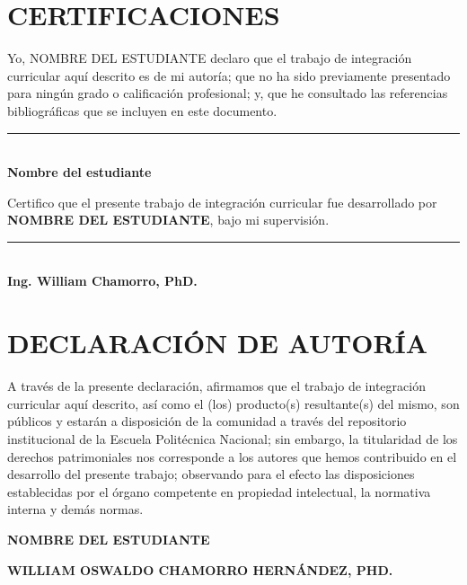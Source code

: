 \chapter*{CERTIFICACIONES}

\justifying
Yo, NOMBRE DEL ESTUDIANTE declaro que el trabajo de integración curricular aquí descrito es de mi autoría; que no ha sido previamente presentado para ningún grado o calificación profesional; y, que he consultado las referencias bibliográficas que se incluyen en este documento.

\vspace{2cm}

\begin{center}
    \rule{8cm}{0.5pt}\\ %
    \textbf{Nombre del estudiante} %
\end{center}

\vspace{2cm}
\justifying
Certifico que el presente trabajo de integración curricular fue desarrollado por \textbf{NOMBRE DEL ESTUDIANTE}, bajo mi supervisión.

\vspace{2cm}

\begin{center}
    \rule{8cm}{0.5pt}\\ %
    \textbf{Ing. William Chamorro, PhD.} %
\end{center}




\chapter*{DECLARACIÓN DE AUTORÍA}

\justifying
A través de la presente declaración, afirmamos que el trabajo de integración curricular aquí descrito, así como el (los) producto(s) resultante(s) del mismo, son públicos y estarán a disposición de la comunidad a través del repositorio institucional de la Escuela Politécnica Nacional; sin embargo, la titularidad de los derechos patrimoniales nos corresponde a los autores que hemos contribuido en el desarrollo del presente trabajo; observando para el efecto las disposiciones establecidas por el órgano competente en propiedad intelectual, la normativa interna y demás normas.

\vspace{2cm}

\raggedright
    \textbf{NOMBRE DEL ESTUDIANTE} %
    \vspace{0.1cm}
    
    \textbf{WILLIAM OSWALDO CHAMORRO HERNÁNDEZ, PHD.} %


    